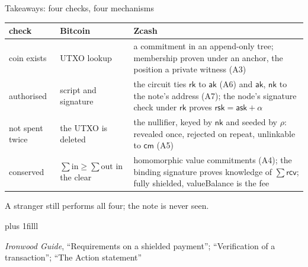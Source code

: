 \documentclass[aspectratio=169,11pt]{beamer}
\newcommand{\cmsym}{\ensuremath{\mathsf{cm}}}
\newcommand{\rksym}{\ensuremath{\mathsf{rk}}}
\newcommand{\aksym}{\ensuremath{\mathsf{ak}}}
\newcommand{\nksym}{\ensuremath{\mathsf{nk}}}
\newcommand{\asksym}{\ensuremath{\mathsf{ask}}}
\newcommand{\rcv}{\ensuremath{\mathsf{rcv}}}
\newcommand{\rsk}{\ensuremath{\mathsf{rsk}}}
\newcommand{\src}[1]{\par\vskip0pt plus 1filll
  {\fontsize{6}{7.2}\selectfont\color{arbdim}\raggedright #1\par}}
\begin{document}
\begin{frame}{Takeaways: four checks, four mechanisms}
\begin{center}\small
\begin{tabular}{@{}p{}p{}p{}@{}}
\toprule
check & Bitcoin & Zcash \\
\midrule
\raggedright coin exists & UTXO lookup & a commitment in an append-only tree;
  membership proven under an anchor, the position a private witness
  (A3) \\
\addlinespace
\raggedright authorised & script and signature & the circuit ties \rksym{}
  to \aksym{} (A6) and \aksym, \nksym{} to the note's address (A7); the
  node's signature check under \rksym{} proves $\rsk = \asksym + \alpha$ \\
\addlinespace
\raggedright not spent twice & the UTXO is deleted & the nullifier, keyed by
  \nksym{}
  and seeded by $\rho$: revealed once, rejected on repeat, unlinkable to
  \cmsym{} (A5) \\
\addlinespace
\raggedright conserved & $\sum \mathrm{in} \ge \sum \mathrm{out}$ in the clear &
  homomorphic value commitments (A4); the binding signature proves
  knowledge of $\sum \rcv$; fully shielded, valueBalance is the fee \\
\bottomrule
\end{tabular}
\end{center}
A stranger still performs all four; the note is never seen.
\src{\emph{Ironwood Guide}, ``Requirements on a shielded payment'';
``Verification of a transaction''; ``The Action statement''}
\end{frame}
\end{document}

